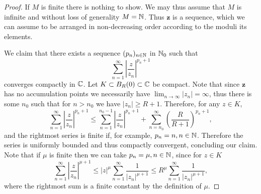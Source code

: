 \begin{proof}
    If $M$ is finite there is nothing to show. We may thus assume that $M$ is infinite and without loss of generality $M = \mathbb{N}$. Thus $\mathbf{z}$ is a sequence, which we can assume to be arranged in non-decreasing order according to the moduli its elements.

    We claim that there exists a sequence $(p_n)_{n \in \mathbb{N}}$ in $\mathbb{N}_0$ such that
    \begin{equation}
        \sum_{n=1}^\infty \left\vert \frac{z}{z_n} \right\vert^{p_n + 1}
    \end{equation}
    converges compactly in $\mathbb{C}$. Let $K \subset B_R(0) \subset \mathbb{C}$ be compact. Note that since $\mathbf{z}$ has no accumulation points we necessarily have $\lim_{n \to \infty} \vert z_n \vert = \infty$, thus there is some $n_0$ such that for $n > n_0$ we have $\vert z_n \vert \geq R + 1$. Therefore, for any $z \in K$,
    \begin{equation*}
        \sum_{n=1}^\infty \left\vert \frac{z}{z_n} \right\vert^{p_n + 1} \leq \sum_{n=1}^{n_0 - 1}  \left\vert \frac{z}{z_n} \right\vert^{p_n + 1} + \sum_{n=n_0}^\infty \left( \frac{R}{R+1} \right)^{p_n + 1},
    \end{equation*}
    and the rightmost series is finite if, for example, $p_n = n, n \in \mathbb{N}$. Therefore the series is uniformly bounded and thus compactly convergent, concluding our claim. Note that if $\mu$ is finite then we can take $p_n = \mu, n \in \mathbb{N}$, since for $z \in K$
    \begin{equation*}
        \sum_{n=1}^\infty \left\vert \frac{z}{z_n} \right\vert^{\mu + 1} \leq \vert z \vert^\mu \sum_{n=1}^\infty \frac{1}{\vert z_n \vert^{\mu+1}} \leq R^\mu \sum_{n=1}^\infty \frac{1}{\vert z_n \vert^{\mu+1}},
    \end{equation*}
    where the rightmost sum is a finite constant by the definition of $\mu$.


\end{proof}
